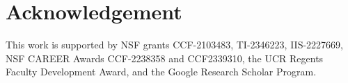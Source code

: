 \section{Acknowledgement}\label{sec:ack}
This work is supported by NSF grants CCF-2103483, TI-2346223, IIS-2227669, NSF CAREER Awards CCF-2238358 and CCF2339310, 
the UCR Regents Faculty Development Award, and the
Google Research Scholar Program.